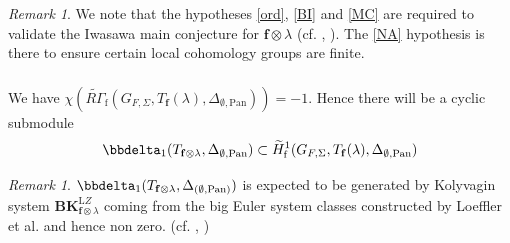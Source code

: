 \documentclass[10pt]{amsart}
\numberwithin{equation}{section}
\theoremstyle{definition}
\theoremstyle{remark} %
\newtheorem{rmk}[thm]{Remark}
\newcommand{\mrm}{\mathrm}
\newcommand{\pan}{\mathrm{Pan}}
\newcommand{\f}{\mathbf{f}}
\begin{document}
		\begin{rmk}
			\label{remark_hypo}
			We note that the hypotheses \ref{ord}, \ref{BI} and \ref{MC} are required to validate the Iwasawa main conjecture for $ \f \otimes \lambda $ (cf. \cite{loeffler2020iwasawatheoryquadratichilbert}, \cite{Wan}). The \ref{NA} hypothesis is there to ensure certain local cohomology groups are finite.
		\end{rmk}
		
		
		\subsubsection{}
		\label{6.1.2}
		We have $ \chi(\widetilde{R\Gamma}_{\mathrm{f}}(G_{F, \Sigma}, T_\f(\lambda), \Delta_{\emptyset,\pan})) = -1 $. Hence there will be a cyclic submodule 
		$$\bbdelta_1(T_{\f \otimes \lambda}, \Delta_{\emptyset,\pan}) \subset \widetilde{H}^1_{\mathrm{f}}(G_{F,\Sigma},T_\f(\lambda),\Delta_{\emptyset,\pan})$$
		\begin{rmk}
			$\bbdelta_1(T_{\f \otimes \lambda}, \Delta_{(\emptyset,\pan)})$ is expected to be generated by Kolyvagin system $\mathbf{BK}^{\mrm LZ}_{\f\otimes \lambda}$ coming from the big Euler system classes constructed by Loeffler et al. and hence non zero. (cf. \cite[Section 8]{loeffler2020iwasawatheoryquadratichilbert}, \cite{loeffler2024blochkatoconjecturegsp4})
		\end{rmk}
		
\end{document}
